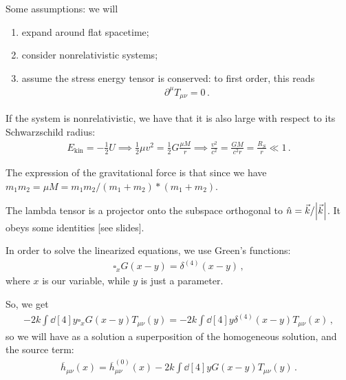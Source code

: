 \documentclass[main.tex]{subfiles}
\begin{document}
Some assumptions: we will 
\begin{enumerate}
  \item expand around flat spacetime;
  \item consider nonrelativistic systems;
  \item assume the stress energy tensor is conserved: to first order, this reads 
  \begin{align}
  \partial^{\mu} T_{\mu \nu } = 0
  \,.
  \end{align}  
\end{enumerate}

If the system is nonrelativistic, we have that it is also large with respect to its Schwarzschild radius:
%
\begin{align}
E _{\text{kin}} = - \frac{1}{2} U \implies 
\frac{1}{2} \mu v^2 = \frac{1}{2} G \frac{\mu M}{r} \implies \frac{v^2}{c^2} = \frac{GM}{c^2 r} = \frac{R_S}{r} \ll 1
\,.
\end{align}

The expression of the gravitational force is that since we have \(m_1 m_2 = \mu M = m_1 m_2 /  (m_1 + m_2 ) * (m_1 + m_2 )\). 

The lambda tensor is a projector onto the subspace orthogonal to \(\hat{n} = \vec{k} / \abs{\vec{k}}\). 
It obeys some identities [see slides].

In order to solve the linearized equations, we use Green's functions: 
%
\begin{align}
\square_x G(x -y) = \delta^{(4)} (x-y)
\,,
\end{align}
%
where \(x\) is our variable, while \(y\) is just a parameter. 

So, we get 
%
\begin{align}
-2k \int \dd[4]{y} \square_x G(x-y) T_{\mu \nu } (y) = -2k \int \dd[4]{y} \delta^{(4)} (x-y) T_{\mu \nu }(x)
\,,
\end{align}
%
so we will have as a solution a superposition of the homogeneous solution, and the source term:
%
\begin{align}
\overline{h}_{\mu \nu } (x) = \overline{h}^{(0)}_{\mu \nu }(x)
- 2k \int \dd[4]{y} G(x-y) T_{\mu \nu }(y)
\,.
\end{align}
\end{document}
